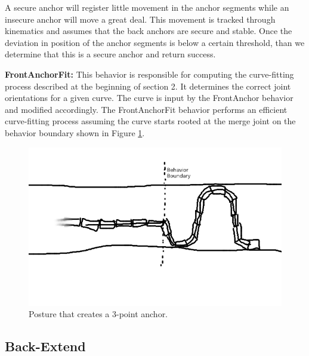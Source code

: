 A secure anchor will register little movement in the anchor segments while an insecure anchor will move a great deal.  This movement is tracked through kinematics and assumes that the back anchors are secure and stable.  Once the deviation in position of the anchor segments is below a certain threshold, than we determine that this is a secure anchor and return success.

\textbf{FrontAnchorFit:} 
This behavior is responsible for computing the curve-fitting process described at the beginning of section 2.  It determines the correct joint orientations for a given curve.  The curve is input by the FrontAnchor behavior and modified accordingly.  The FrontAnchorFit behavior performs an efficient curve-fitting process assuming the curve starts rooted at the merge joint on the behavior boundary shown in Figure \ref{frontanchor1}.

\begin{figure}
\begin{center}
\includegraphics[scale=0.5]{2_frontanchor_1.png}
\end{center}
\caption{Posture that creates a 3-point anchor.}
\label{frontanchor1}
\end{figure}


\subsection{Back-Extend}

